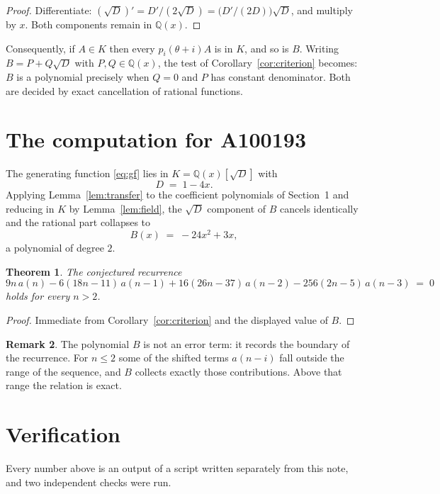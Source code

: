 \documentclass[11pt,a4paper]{article}
\theoremstyle{plain}
\newtheorem{theorem}{Theorem}
\theoremstyle{definition}
\newtheorem{remark}[theorem]{Remark}
\begin{document}
\begin{proof}
Differentiate: $(\sqrt{D})'=D'/(2\sqrt{D})=\bigl(D'/(2D)\bigr)\sqrt{D}$, and multiply by
$x$. Both components remain in $\mathbb{Q}(x)$.
\end{proof}

Consequently, if $A\in K$ then every $p_{i}(\theta+i)A$ is in $K$, and so is $B$. Writing
$B=P+Q\sqrt{D}$ with $P,Q\in\mathbb{Q}(x)$, the test of Corollary~\ref{cor:criterion}
becomes: $B$ is a polynomial precisely when $Q=0$ and $P$ has constant denominator. Both
are decided by exact cancellation of rational functions.

\section{The computation for A100193}

The generating function \eqref{eq:gf} lies in $K=\mathbb{Q}(x)[\sqrt{D}]$ with
\[
D \;=\; 1 - 4 x .
\]
Applying Lemma~\ref{lem:transfer} to the coefficient polynomials of Section~1 and reducing
in $K$ by Lemma~\ref{lem:field}, the $\sqrt{D}$ component of $B$ cancels identically and
the rational part collapses to
\[
B(x)\;=\;- 24 x^{2} + 3 x ,
\]
a polynomial of degree $2$.

\begin{theorem}
The conjectured recurrence
\[
9 n\,a(n) -  6 \left(18 n - 11\right)\,a(n-1) + 16 \left(26 n - 37\right)\,a(n-2) -  256 \left(2 n - 5\right)\,a(n-3) \;=\;0
\]
holds for every $n>2$.
\end{theorem}

\begin{proof}
Immediate from Corollary~\ref{cor:criterion} and the displayed value of $B$.
\end{proof}

\begin{remark}
The polynomial $B$ is not an error term: it records the boundary of the recurrence. For
$n\le2$ some of the shifted terms $a(n-i)$ fall outside the range of the sequence,
and $B$ collects exactly those contributions. Above that range the relation is exact.
\end{remark}

\section{Verification}

Every number above is an output of a script written separately from this note, and two
independent checks were run.
\end{document}
